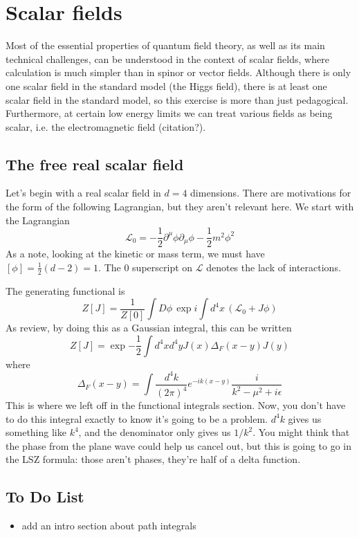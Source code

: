 \documentclass[main.tex]{subfiles}
\begin{document}
\chapter{Scalar fields}
Most of the essential properties of quantum field theory, as well as its main technical challenges, can be understood in the context of scalar fields, where calculation is much simpler than in spinor or vector fields. Although there is only one scalar field in the standard model (the Higgs field), there is at least one scalar field in the standard model, so this exercise is more than just pedagogical. Furthermore, at certain low energy limits we can treat various fields as being scalar, i.e. the electromagnetic field (citation?). 

\section{The free real scalar field}
Let's begin with a real scalar field in $d = 4$ dimensions. There are motivations for the form of the following Lagrangian, but they aren't relevant here. We start with the Lagrangian
\[
\mathcal{L}_0 = - \frac{1}{2} \partial^\mu \phi \partial_\mu \phi - \frac{1}{2} m^2 \phi^2
\]
As a note, looking at the kinetic or mass term, we must have $[\phi] = \frac{1}{2}(d - 2) = 1$. The $0$ superscript on $\mathcal{L}$ denotes the lack of interactions.

The generating functional is 
\[
Z[J] = \frac{1}{Z[0]} \int D\phi \, \exp{i \int d^4x \, \left( \mathcal{L}_0 + J \phi \right)} 
\]
As review, by doing this as a Gaussian integral, this can be written
\[
Z[J] = \exp{
-\frac{1}{2} \int d^4 x d^4 y J(x) \Delta_F (x - y) J(y)
}
\]
where
\[
\Delta_F (x-y) = \int \frac{d^4 k}{(2\pi)^4} e^{-ik(x-y)} \frac{i}{k^2 - \mu^2 + i\epsilon}
\]
This is where we left off in the functional integrals section. Now, you don't have to do this integral exactly to know it's going to be a problem. $d^4 k$ gives us something like $k^4$, and the denominator only gives us $1/k^2$. You might think that the phase from the plane wave could help us cancel out, but this is going to go in the LSZ formula: those aren't phases, they're half of a delta function.
\section{To Do List}
\begin{itemize}
\item add an intro section about path integrals
\end{itemize}
\end{document}
